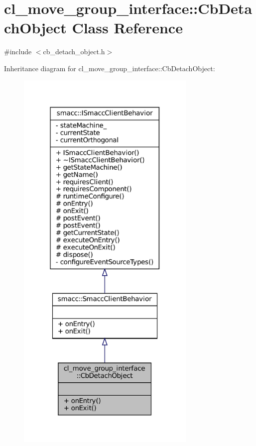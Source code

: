 \hypertarget{classcl__move__group__interface_1_1CbDetachObject}{}\section{cl\+\_\+move\+\_\+group\+\_\+interface\+:\+:Cb\+Detach\+Object Class Reference}
\label{classcl__move__group__interface_1_1CbDetachObject}


{\ttfamily \#include $<$cb\+\_\+detach\+\_\+object.\+h$>$}



Inheritance diagram for cl\+\_\+move\+\_\+group\+\_\+interface\+:\+:Cb\+Detach\+Object\+:
\nopagebreak
\begin{figure}[H]
\begin{center}
\leavevmode
\includegraphics[width=244pt]{classcl__move__group__interface_1_1CbDetachObject__inherit__graph}
\end{center}
\end{figure}


